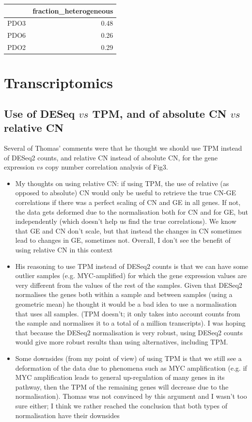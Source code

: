 \documentclass{article}
\begin{document}
\begin{table}[ht]
\centering
\begin{tabular}{rr}
  \hline
 & fraction\_heterogeneous \\ 
  \hline
PDO3 & 0.48 \\ 
  PDO6 & 0.26 \\ 
  PDO2 & 0.29 \\ 
   \hline
\end{tabular}
\end{table}


\section{Transcriptomics}
\subsection{Use of DESeq $vs$ TPM, and of absolute CN $vs$ relative CN}
Several of Thomas' comments were that he thought we should use TPM instead of DESeq2 counts, and relative CN instead of absolute CN, for the gene expression $vs$ copy number correlation analysis of Fig3.

\begin{itemize}
\item My thoughts on using relative CN: if using TPM, the use of relative (as opposed to absolute) CN would only be useful to retrieve the true CN-GE correlations if there was a perfect scaling of CN and GE in all genes. If not, the data gets deformed due to the normalisation both for CN and for GE, but independently (which doesn't help us find the true correlations). We know that GE and CN don't scale, but that instead the changes in CN sometimes lead to changes in GE, sometimes not. Overall, I don't see the benefit of using relative CN in this context
\item His reasoning to use TPM instead of DESeq2 counts is that we can have some outlier samples (e.g. MYC-amplified) for which the gene expression values are very different from the values of the rest of the samples. Given that DESeq2 normalises the genes both within a sample and between samples (using a geometric mean) he thought it would be a bad idea to use a normalisation that uses all samples. (TPM doesn't; it only takes into account counts from the sample and normalises it to a total of a million transcripts). I was hoping that because the DESeq2 normalisation is very robust, using DESeq2 counts would give more robust results than using alternatives, including TPM. 
\item Some downsides (from my point of view) of using TPM is that we still see a deformation of the data due to phenomena such as MYC amplification (e.g. if MYC amplification leads to general up-regulation of many genes in its pathway, then the TPM of the remaining genes will decrease due to the normalisation). Thomas was not convinced by this argument and I wasn't too sure either; I think we rather reached the conclusion that both types of normalisation have their downsides
\end{itemize}
\end{document}

